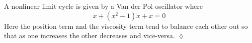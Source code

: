 \begin{example}
A nonlinear limit cycle is given by a Van der Pol oscillator where
$$\ddot{x} + (x^2-1)\dot{x} + x = 0$$
Here the position term and the viscosity term tend to balance each other out so that as one increases the other decreases and vice-versa.
$\lozenge$
\end{example}

